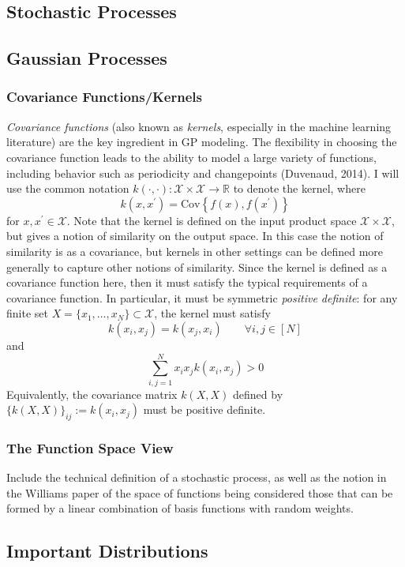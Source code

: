 \documentclass[12pt]{article}
\newcommand{\R}{\mathcal{R}}
\newcommand{\Cov}{\mathrm{Cov}}
\def\R{\mathbb{R}}
\begin{document}
\subsection{Stochastic Processes}

\subsection{Gaussian Processes}
\subsubsection{Covariance Functions/Kernels}
\textit{Covariance functions} (also known as \textit{kernels}, especially in the machine learning literature) are the key ingredient in GP modeling. The flexibility in choosing the covariance 
function leads to the ability to model a large variety of functions, including behavior such as periodicity and changepoints (Duvenaud, 2014). I will use the common notation 
$k(\cdot, \cdot): \mathcal{X} \times \mathcal{X} \to \R$ to denote the kernel, where 
\[k(x, x^\prime) = \Cov\left\{f(x), f(x^\prime)\right\}\] 
for $x, x^\prime \in \mathcal{X}$. Note that the kernel is defined on the input product space $\mathcal{X} \times \mathcal{X}$, but gives a notion of similarity on the output space. In this case
the notion of similarity is as a covariance, but kernels in other settings can be defined more generally to capture other notions of similarity. Since the kernel is defined as a covariance function
here, then it must satisfy the typical requirements of a covariance function. In particular, it must be symmetric \textit{positive definite}: for any finite set $X = \{x_1, \dots, x_N\} \subset \mathcal{X}$, the 
kernel must satisfy
\[k(x_i, x_j) = k(x_j, x_i) \qquad \forall i, j \in [N]\]
and
\[\sum_{i, j = 1}^N x_i x_j k(x_i, x_j) > 0\]
Equivalently, the covariance matrix $k(X, X)$ defined by $\{k(X, X)\}_{ij} := k(x_i, x_j)$ must be positive definite. 

\subsubsection{The Function Space View}
Include the technical definition of a stochastic process, as well as the notion in the Williams paper of the space of functions being considered those that can be formed
by a linear combination of basis functions with random weights. 




\subsection{Important Distributions}
\end{document}
